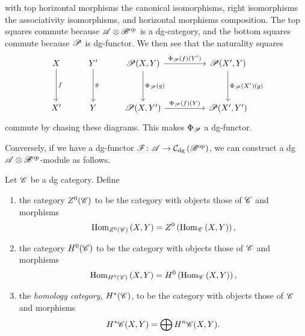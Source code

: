 \documentclass[dissertation.tex]{subfiles}
\begin{document}
        with top horizontal morphisms the canonical isomorphisms, right isomorphisms the associativity isomorphisms, and horizontal morphisms composition.
        The top squares commute because $\mathscr{A} \otimes \mathscr{B}^{\text{op}}$ is a dg-category, and the bottom squares commute because $\mathscr{P}$ is dg-functor.
        We then see that the naturality squares
        $$\begin{tikzcd}
          X \arrow{dd}{f} & Y^\prime \arrow{dd}{g} & \funct{P}(X,Y) \arrow{rr}{\Phi_{\funct{P}}(f)(Y^\prime)}\arrow{dd}{\Phi_{\funct{P}}(g)} && \funct{P}(X^\prime, Y)\arrow{dd}{\Phi_{\funct{P}}(X^\prime)(g)}\\
          \\
          X^\prime & Y & \funct{P}(X,Y^\prime) \arrow{rr}{\Phi_{\funct{P}}(f)(Y)} && \funct{P}(X^\prime,Y^\prime)
        \end{tikzcd}$$
        commute by chasing these diagrams.
        This makes $\Phi_{\mathscr{P}}$ a dg-functor.

        Conversely, if we have a dg-functor $\mathscr{F} \colon \mathscr{A} \to \mathcal{C}_\text{dg}\left(\mathscr{B}^{\text{op}}\right)$, we can construct a dg $\mathscr{A} \otimes \mathscr{B}^{\text{op}}$-module as follows.

        \begin{defn}
          Let $\mathscr{C}$ be a dg category.
          Define
          \begin{enumerate}
          \item
            the category $Z^0(\mathscr{C})$ to be the category with objects those of $\mathscr{C}$ and morphisms
            $$\operatorname{Hom}_{Z^0(\mathscr{C})}\left(X,Y\right) = Z^0\left(\operatorname{Hom}_{\mathscr{C}}\left(X,Y\right)\right),$$
          \item
            the category $H^0(\mathscr{C})$ to be the category with objects those of $\mathscr{C}$ and morphisms
            $$\operatorname{Hom}_{H^0(\mathscr{C})}\left(X,Y\right) = H^0\left(\operatorname{Hom}_{\mathscr{C}}\left(X,Y\right)\right),$$
          \item
            the {\it homology category}, $H^\ast(\mathscr{C})$, to be the category with objects those of $\mathscr{C}$ and morphisms 
            $$H^\ast\mathscr{C}(X,Y) = \bigoplus H^n\mathscr{C}(X,Y).$$
          \end{enumerate}
        \end{defn}
\end{document}
